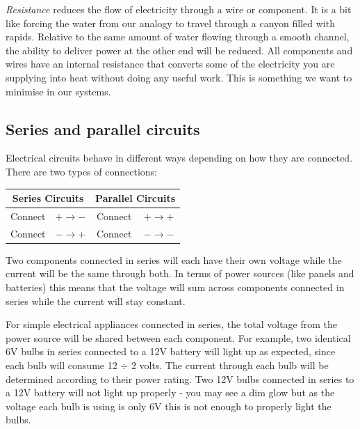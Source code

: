 \documentclass{article}
\theoremstyle{definition}
\theoremstyle{definition}
\theoremstyle{remark}
\begin{document}
    \textit{Resistance} reduces the flow of electricity through a wire or component. It is a bit like forcing the water from our analogy to travel through a canyon filled with rapids. Relative to the same amount of water flowing through a smooth channel, the ability to deliver power at the other end will be reduced. All components and wires have an internal resistance that converts some of the electricity you are supplying into heat without doing any useful work. This is something we want to minimise in our systems. 
  

  \subsection{Series and parallel circuits} %
  \label{sub:series_and_parallel_circuits}

    Electrical circuits behave in different ways depending on how they are connected. There are two types of connections: 
      
      \begin{table}[!ht]
        \centering
        \begin{tabular}{|| c | c | c | c ||}
          \hline
          \multicolumn{2}{|c|}{Series Circuits}  & \multicolumn{2}{|c|}{Parallel Circuits}  \\
          \hline \hline
          Connect & $+ \rightarrow -$ & Connect & $+ \rightarrow +$ \\
          \hline
          Connect & $- \rightarrow +$ & Connect & $- \rightarrow -$ \\
          \hline
        \end{tabular}
        \label{table:two_types_of_connections}
      \end{table}

    Two components connected in series will each have their own voltage while the current will be the same through both. In terms of power sources (like panels and batteries) this means that the voltage will sum across components connected in series while the current will stay constant. 

    For simple electrical appliances connected in series, the total voltage from the power source will be shared between each component. For example, two identical 6V bulbs in series connected to a 12V battery will light up as expected, since each bulb will consume 12 \(\div\) 2 volts. The current through each bulb will be determined according to their power rating. Two 12V bulbs connected in series to a 12V battery will not light up properly - you may see a dim glow but as the voltage each bulb is using is only 6V this is not enough to properly light the bulbs.
\end{document}
